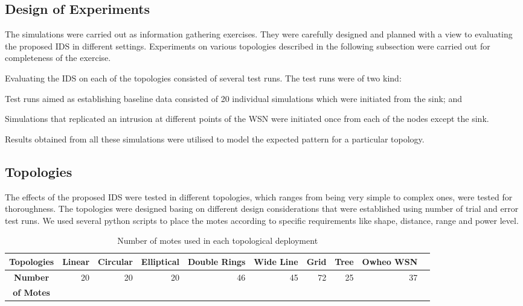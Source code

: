 \documentclass[conference,final]{IEEEtran}
\newcommand*{\bd}[1]{\multicolumn{1}{|c}{\bfseries #1}}
\begin{document}
\subsection*{Design of Experiments}
\label{subsec:exp_des}

The simulations were carried out as information gathering exercises.
They were carefully designed and planned with a view to evaluating the proposed IDS in different settings.
Experiments on various topologies described in the following subsection were carried out for completeness of the exercise.

Evaluating the IDS on each of the topologies consisted of several test runs.
The test runs were of two kind: 
\begin{inparaenum}
\item Test runs aimed as establishing baseline data consisted of 20 individual simulations which were initiated from the sink; and
\item Simulations that replicated an intrusion at different points of the WSN were initiated once from each of the nodes except the sink.
\end{inparaenum}
Results obtained from all these simulations were utilised to model the expected pattern for a particular topology.

\subsection*{Topologies}
\label{subsec:topos}

The effects of the proposed IDS were tested in different topologies, which ranges from being very simple to complex ones, were tested for thoroughness. 
The topologies were designed basing on different design considerations that were established using number of trial and error test runs.
We used several python scripts to place the motes according to specific requirements like shape, distance, range and power level. 

\begin{table}[t!]
\centering
\begin{tabular}{|l|*{8}{r|}r}
\hline
\bd{Topologies}           & \bd{Linear} & \bd{Circular} & \bd{Elliptical} & \bd{Double Rings} & \bd{Wide Line} & \bd{Grid} & \bd{Tree} & \bd{Owheo WSN}   \\
\hline
\bd{Number}           & 20 & 20 & 20 & 46 & 45 & 72 & 25 & 37   \\
 \bd{of Motes}           &  &  &  &  &  &  &  &    \\
\hline
\end{tabular}
\caption{Number of motes used in each topological deployment}
\label{tab:topos}
\end{table}
\end{document}
